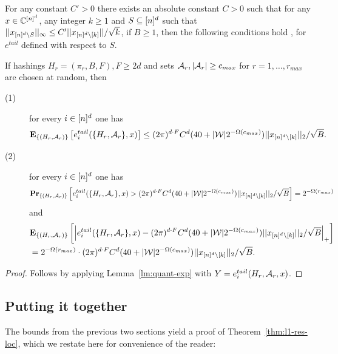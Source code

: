 \begin{lemma}\label{lm:loc-tail-small}
For any constant $C'>0$ there exists an absolute constant $C>0$ such that for any $x\in \mathbb{C}^{{[n]^d}}$, any integer $k\geq 1$ and $S\subseteq {[n]^d}$ such that $||x_{{[n]^d}\setminus S}||_\infty\leq C'||x_{{[n]^d}\setminus [k]}||/\sqrt{k}$, if $B\geq 1$, then the following conditions hold , for $e^{tail}$ defined with respect to $S$.


If hashings $H_r=(\pi_r, B, F), F\geq 2d$ and sets ${\mathcal{A}}_r, |{\mathcal{A}}_r|\geq c_{max}$ for $r=1,\ldots, r_{max}$ are chosen at random, then
\begin{description}
\item[(1)] for every $i\in {[n]^d}$ one has 
$$
{\bf \mbox{\bf E}}_{\{(H_r, {\mathcal{A}}_r)\}}\left[e^{tail}_i(\{H_r, {\mathcal{A}}_r\}, x)\right]\leq  (2\pi)^{d\cdot F} C^d (40+|\mathcal{W}|2^{-\Omega(c_{max})})  ||x_{{[n]^d} \setminus [k]}||_2/\sqrt{B}.
$$ 

\item[(2)] for every $i\in {[n]^d}$ one has 
$$
{\bf \mbox{\bf Pr}}_{\{(H_r, {\mathcal{A}}_r)\}}\left[e^{tail}_i(\{H_r, {\mathcal{A}}_r\}, x)>  (2\pi)^{d\cdot F} C^d (40+|\mathcal{W}|2^{-\Omega(c_{max})})  ||x_{{[n]^d} \setminus [k]}||_2/\sqrt{B}\right]=2^{-\Omega(r_{max})}
$$ 
and
\begin{equation*}
\begin{split}
&{\bf \mbox{\bf E}}_{\{(H_r, {\mathcal{A}}_r)\}}\left[\left|e^{tail}_i(\{H_r, {\mathcal{A}}_r\}, x)- (2\pi)^{d\cdot F} C^d (40+|\mathcal{W}|2^{-\Omega(c_{max})})  ||x_{{[n]^d} \setminus [k]}||_2/\sqrt{B}\right|_+\right]\\
&=2^{-\Omega(r_{max})}\cdot (2\pi)^{d\cdot F} C^d (40+|\mathcal{W}|2^{-\Omega(c_{max})})  ||x_{{[n]^d} \setminus [k]}||_2/\sqrt{B}.
\end{split}
\end{equation*}

\end{description}
\end{lemma}
\begin{proof}

Follows by applying  Lemma~\ref{lm:quant-exp} with $Y=e^{tail}_{i}(H_r, {\mathcal{A}}_r, x)$.
\end{proof}

\subsection{Putting it together}
The bounds from the previous two sections yield a proof of Theorem~\ref{thm:l1-res-loc}, which we restate here for convenience of the reader:

